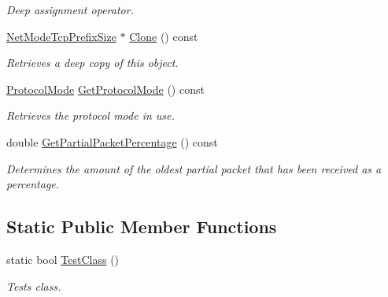 \begin{DoxyCompactItemize}
\begin{DoxyCompactList}\small\item\em Deep assignment operator. \item\end{DoxyCompactList}\item 
\hyperlink{class_net_mode_tcp_prefix_size}{NetModeTcpPrefixSize} $\ast$ \hyperlink{class_net_mode_tcp_prefix_size_a9ee4ff58d9f3d88f626fc0e65025b1e3}{Clone} () const 
\begin{DoxyCompactList}\small\item\em Retrieves a deep copy of this object. \item\end{DoxyCompactList}\item 
\hyperlink{class_net_mode_a43cfa55ee6a4db66a8d7d6c27f766964}{ProtocolMode} \hyperlink{class_net_mode_tcp_prefix_size_a632cf5d27fd0c77f3f9db74c2b4e2415}{GetProtocolMode} () const 
\begin{DoxyCompactList}\small\item\em Retrieves the protocol mode in use. \item\end{DoxyCompactList}\item 
double \hyperlink{class_net_mode_tcp_prefix_size_a9cef3f55fdd4fd5db6f6a2570c9178a5}{GetPartialPacketPercentage} () const 
\begin{DoxyCompactList}\small\item\em Determines the amount of the oldest partial packet that has been received as a percentage. \item\end{DoxyCompactList}\end{DoxyCompactItemize}
\subsection*{Static Public Member Functions}
\begin{DoxyCompactItemize}
\item 
static bool \hyperlink{class_net_mode_tcp_prefix_size_a9fc90706e6690880307714fbc917108f}{TestClass} ()
\begin{DoxyCompactList}\small\item\em Tests class. \item\end{DoxyCompactList}\end{DoxyCompactItemize}


